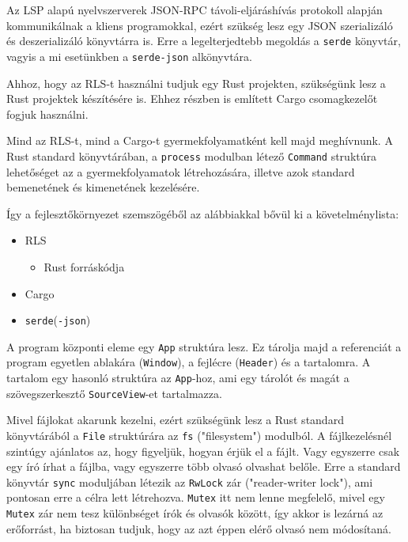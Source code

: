 Az LSP alapú nyelvszerverek JSON-RPC\cite{json-rpc} távoli-eljáráshívás protokoll alapján kommunikálnak
a kliens programokkal, ezért szükség lesz egy JSON szerializáló és deszerializáló könyvtárra is.
Erre a legelterjedtebb megoldás a \texttt{serde} könyvtár, vagyis a mi esetünkben a \texttt{serde-json} alkönyvtára.

Ahhoz, hogy az RLS-t használni tudjuk egy Rust projekten, szükségünk lesz a Rust projektek készítésére is.
Ehhez  részben is említett Cargo csomagkezelőt fogjuk használni.

Mind az RLS-t, mind a Cargo-t gyermekfolyamatként kell majd meghívnunk.
A Rust standard könyvtárában, a \texttt{process} modulban létező \texttt{Command} struktúra
lehetőséget az a gyermekfolyamatok létrehozására, illetve azok standard bemenetének és kimenetének kezelésére.

Így a fejlesztőkörnyezet szemszögéből az alábbiakkal bővül ki a követelménylista:

\begin{itemize}
	\item RLS
	\begin{itemize}
		\item Rust forráskódja
	\end{itemize}
	\item Cargo
	\item \texttt{serde}(\texttt{-json})
\end{itemize}


A program központi eleme egy \texttt{App} struktúra lesz. 
Ez tárolja majd a referenciát a program egyetlen ablakára (\texttt{Window}), a fejlécre (\texttt{Header})
és a tartalomra.
A tartalom egy hasonló struktúra az \texttt{App}-hoz, ami egy tárolót és magát a szövegszerkesztő \texttt{SourceView}-et tartalmazza.

Mivel fájlokat akarunk kezelni, ezért szükségünk lesz a Rust standard könyvtárából a \texttt{File} struktúrára
az \texttt{fs} ("filesystem") modulból.
A fájlkezelésnél szintúgy ajánlatos az, hogy figyeljük, hogyan érjük el a fájlt.
Vagy egyszerre csak egy író írhat a fájlba, vagy egyszerre több olvasó olvashat belőle.
Erre a standard könyvtár \texttt{sync} moduljában létezik az \texttt{RwLock} zár ("reader-writer lock"),
ami pontosan erre a célra lett létrehozva.
\texttt{Mutex} itt nem lenne megfelelő, mivel egy \texttt{Mutex} zár nem tesz különbséget írók és olvasók között,
így akkor is lezárná az erőforrást, ha biztosan tudjuk, hogy az azt éppen elérő olvasó nem módosítaná.

